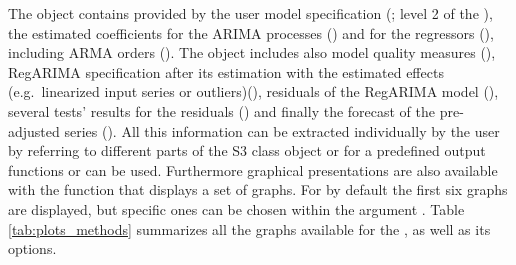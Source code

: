 \documentclass[article]{jss}
\begin{document}
The  object contains provided by the user model
specification (; level 2 of the ),
the estimated coefficients for the ARIMA processes
() and for the regressors
(), including ARMA orders ().
The object includes also model quality measures (),
RegARIMA specification after its estimation with the estimated effects
(e.g.~linearized input series or outliers)(), residuals of
the RegARIMA model (), several tests' results for the
residuals () and finally the forecast of the
pre-adjusted series (). All this information can be
extracted individually by the user by referring to different parts of
the S3 class object or for a predefined output functions 
or  can be used. Furthermore graphical presentations are
also available with the function  that displays a set of
graphs. For  by default the first six graphs are
displayed, but specific ones can be chosen within the argument
. Table \ref{tab:plots_methods} summarizes all the graphs
available for the , as well as its 
options.
\end{document}
